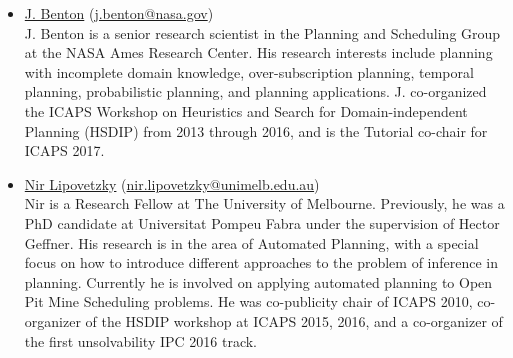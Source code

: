 \documentclass[10pt]{article}
\begin{document}
\begin{itemize}


\item \href{https://ti.arc.nasa.gov/profile/j-benton/}{J. Benton}
  (\href{mailto:j.benton@nasa.gov}{j.benton@nasa.gov})\\
  J. Benton is a senior research scientist in the Planning and Scheduling Group at the NASA Ames Research Center. His research interests include planning with incomplete domain knowledge, over-subscription planning, temporal planning, probabilistic planning, and planning applications. J. co-organized the ICAPS Workshop on Heuristics and Search for Domain-independent Planning (HSDIP) from 2013 through 2016, and is the Tutorial co-chair for ICAPS 2017.


%


\item \href{http://people.eng.unimelb.edu.au/nlipovetzky/}{Nir Lipovetzky}
  (\href{mailto:nir.lipovetzky@unimelb.edu.au}{nir.lipovetzky@unimelb.edu.au})\\
Nir is a Research Fellow at The University of Melbourne. Previously, he was a
PhD candidate at Universitat Pompeu Fabra under the supervision of Hector Geffner.
His research is in the area of Automated Planning, with a special focus on how
to introduce different approaches to the problem of inference in planning.
Currently he is involved on applying automated planning to Open Pit Mine
Scheduling problems. He was co-publicity chair of ICAPS 2010, co-organizer
of the HSDIP workshop at ICAPS 2015, 2016, and a co-organizer of the first unsolvability
IPC 2016 track.


\end{itemize}
\end{document}
